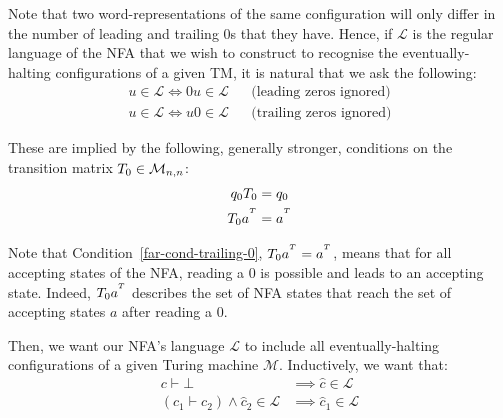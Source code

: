 
Note that two word-representations of the same configuration will only differ in the number of leading and trailing 0s that they have. Hence, if $\mathcal{L}$ is the regular language of the NFA that we wish to construct to recognise the eventually-halting configurations of a given TM, it is natural that we ask the following:
\begin{align*}
  u \in \mathcal{L} \iff 0u \in \mathcal{L} &  & \text{(leading zeros ignored)}
  \\
  u \in \mathcal{L} \iff u0 \in \mathcal{L} &  & \text{(trailing zeros ignored)}
\end{align*}

These are implied by the following, generally stronger, conditions on the transition matrix $T_0 \in \mathcal{M}_{n,n}$:
\begin{align}
  q_0 T_0    & = q_0
  \label{far-cond-leading-0}
  \\
  T_0 a^{^T} & = a^{^T}
  \label{far-cond-trailing-0}
\end{align}


Note that Condition~\ref{far-cond-trailing-0}, $T_0 a^{^T} = a^{^T}$, means that for all accepting states of the NFA, reading a 0 is possible and leads to an accepting state. Indeed, $T_0 a^{^T}$ describes the set of NFA states that reach the set of accepting states $a$ after reading a $0$.


Then, we want our NFA's language $\mathcal{L}$ to include all eventually-halting configurations of a given Turing machine $\mathcal{M}$.  Inductively, we want that:
\begin{align*}
  c\vdash\bot                                    & \implies \hat{c} \in \mathcal{L}  \\
  (c_1\vdash c_2)\land \hat{c}_2 \in \mathcal{L} & \implies\hat{c}_1 \in \mathcal{L}
\end{align*}


